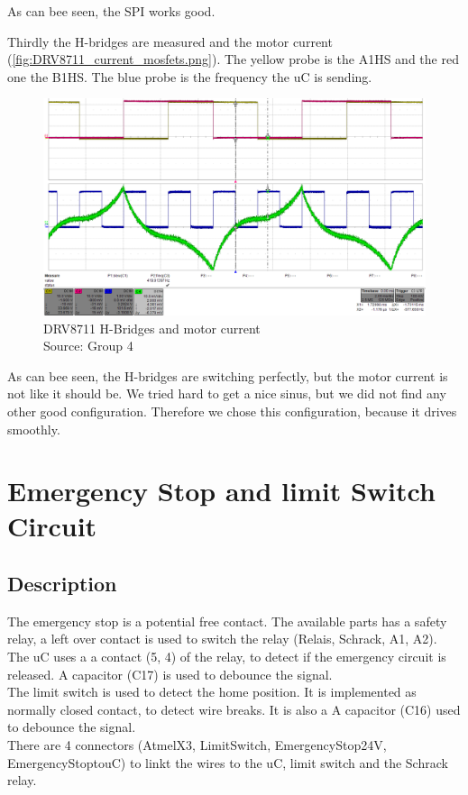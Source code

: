 \documentclass[a4paper,12pt]{scrreprt}
\begin{document}
As can bee seen, the \acs{SPI} works good.

Thirdly the H-bridges are measured and the motor current (\autoref{fig:DRV8711_current_mosfets.png}). The yellow probe is the A1HS and the red one the B1HS. The blue probe is the frequency the \acs{uC} is sending.

\begin{figure}[H]
  \centering
   \includegraphics[width=1\textwidth]{pictures/measurements/DRV8711_current_mosfets.png}
   \caption[DRV8711 H-Bridges Voltage and motor current]{DRV8711 H-Bridges and motor current\\
	Source: Group 4  
  }
   \label{fig:DRV8711_current_mosfets.png}
\end{figure}
As can bee seen, the H-bridges are switching perfectly, but the motor current is not like it should be. We tried hard to get a nice sinus, but we did not find any other good configuration. Therefore we chose this configuration, because it drives smoothly.

\section{Emergency Stop and limit Switch Circuit}
\subsection{Description}
The emergency stop is a potential free contact. The available parts has a safety relay, a left over contact is used to switch the relay (Relais, Schrack, A1, A2). The \acs{uC} uses a a contact (5, 4) of the relay, to detect if the emergency circuit is released. A capacitor (C17) is used to debounce the signal.\\
The limit switch is used to detect the home position. It is implemented as normally closed contact, to detect wire breaks. It is also a A capacitor (C16) used to debounce the signal.\\
There are 4 connectors (AtmelX3, LimitSwitch, EmergencyStop24V, EmergencyStoptouC) to linkt the wires to the \acs{uC}, limit switch and the Schrack relay.
\end{document}
